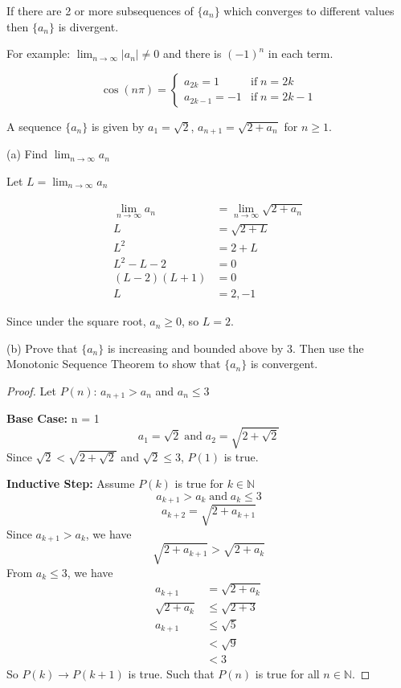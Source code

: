 \begin{theorem}
  If there are 2 or more subsequences of \(\{a_{n}\}\) which converges to different values then \(\{a_{n}\}\) is divergent.
\end{theorem}

For example: $\lim_{n \to \infty} |a_{n}| \neq 0$ and there is $(-1)^{n}$ in each term.

\[
  \cos{(n\pi)} = \begin{cases}
    a_{2k} = 1 & \text{if} \; n = 2k \\
    a_{2k - 1} = -1 & \text{if} \; n = 2k - 1
  \end{cases}
\]

A sequence $\{a_{n}\}$ is given by $a_{1} = \sqrt{2}$, $a_{n + 1} = \sqrt{2 + a_{n}}$ for $n \ge 1$.

(a) Find $\lim_{n \to \infty} a_{n}$

Let $L = \lim_{n \to \infty} a_{n}$

\[
  \begin{aligned}
    \lim_{n \to \infty} a_{n} &= \lim_{n \to \infty} \sqrt{2 + a_{n}} \\
    L &= \sqrt{2 + L} \\ 
    L^2 &= 2 + L \\
    L^2 - L - 2 &= 0 \\
    (L - 2)(L + 1) &= 0 \\
    L &= 2, -1
  \end{aligned}
\]

Since under the square root, $a_{n} \ge 0$, so $L = 2$.

(b) Prove that $\{a_{n}\}$ is increasing and bounded above by 3. Then use the Monotonic Sequence Theorem to show that $\{a_{n}\}$ is convergent.

\begin{proof}
  Let \(P(n)\): \(a_{n + 1} > a_{n}\) and $a_{n} \le 3$

  \textbf{Base Case: } n = 1
  \[
    a_1 = \sqrt{2} \; \mathrm{and} \; a_2 = \sqrt{2 + \sqrt{2}}
  \]
  Since \(\sqrt{2} < \sqrt{2 + \sqrt{2}}\) and \(\sqrt{2} \le 3\), \(P(1)\) is true.

  \textbf{Inductive Step: } Assume \(P(k)\) is true for \(k \in \mathbb{N}\)
  \[
    a_{k + 1} > a_{k} \; \mathrm{and} \; a_{k} \le 3
  \]
  \[
    a_{k + 2} = \sqrt{2 + a_{k + 1}}
  \]
  Since \(a_{k + 1} > a_{k}\), we have
  \[
    \sqrt{2 + a_{k + 1}} > \sqrt{2 + a_{k}}
  \]
  From $a_{k} \le 3$, we have
  \[
    \begin{aligned}
      a_{k + 1} &= \sqrt{2 + a_{k}} \\
      \sqrt{2 + a_{k}} &\le \sqrt{2 + 3} \\
      a_{k + 1} &\le \sqrt{5} \\
      &< \sqrt{9} \\
      &< 3
    \end{aligned}
  \]
  So \(P(k) \to P(k + 1)\) is true. Such that \(P(n)\) is true for all \(n \in \mathbb{N}\).
\end{proof}